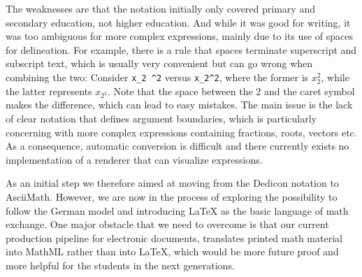 \documentclass{easychair}
\begin{document}
The weaknesses are that the notation initially only covered primary and
secondary education, not higher education. And while it was good for writing, it
was too ambiguous for more complex expressions, mainly due to its use of spaces
for delineation. For example, there is a rule that spaces terminate superscript
and subscript text, which is usually very convenient but can go wrong when
combining the two: Consider \verb+x_2 ^2+ versus \verb+x_2^2+, where the former
is $x_2^2$, while the latter represents $x_{2^2}$. Note that the space between the
$2$ and the caret symbol makes the difference, which can lead to easy mistakes.
The main issue is the lack of clear notation that defines argument boundaries,
which is particularly concerning with more complex expressions containing
fractions, roots, vectors etc.  As a consequence, automatic conversion is
difficult and there currently exists no implementation of a renderer that can
visualize expressions.

As an initial step we therefore aimed at moving from the Dedicon notation to
AsciiMath. However, we are now in the process of exploring the possibility to
follow the German model and introducing {\LaTeX} as the basic language of math
exchange.  One major obstacle that we need to overcome is that our current
production pipeline for electronic documents, translates printed math material
into MathML rather than into {\LaTeX}, which would be more future proof and more
helpful for the students in the next generations.



\end{document}
